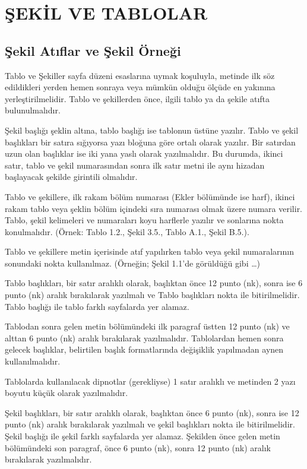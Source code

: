 \chapter{ŞEKİL VE TABLOLAR}
\section{Şekil Atıflar ve Şekil Örneği}
Tablo ve Şekiller sayfa düzeni esaslarına uymak koşuluyla, metinde ilk söz edildikleri yerden hemen sonraya veya mümkün olduğu ölçüde en yakınına yerleştirilmelidir. Tablo ve şekillerden önce, ilgili tablo ya da şekile atıfta bulunulmalıdır.

Şekil başlığı şeklin altına, tablo başlığı ise tablonun üstüne yazılır. Tablo ve şekil başlıkları bir satıra sığıyorsa yazı bloğuna göre ortalı olarak yazılır. Bir satırdan uzun olan başlıklar ise iki yana yaslı olarak yazılmalıdır. Bu durumda, ikinci satır, tablo ve şekil numarasından sonra ilk satır metni ile aynı hizadan başlayacak şekilde girintili olmalıdır.

Tablo ve şekillere, ilk rakam bölüm numarası (Ekler bölümünde ise harf), ikinci rakam tablo veya şeklin bölüm içindeki sıra numarası olmak üzere numara verilir. Tablo, şekil kelimeleri ve numaraları koyu harflerle yazılır ve sonlarına nokta konulmalıdır.  (Örnek: Tablo 1.2., Şekil 3.5., Tablo A.1., Şekil B.5.).

Tablo ve şekillere metin içerisinde atıf yapılırken tablo veya şekil numaralarının sonundaki nokta kullanılmaz. (Örneğin; Şekil 1.1'de görüldüğü gibi \ldots{})

Tablo başlıkları, bir satır aralıklı olarak, başlıktan önce 12 punto (nk), sonra ise 6 punto (nk) aralık bırakılarak yazılmalı ve Tablo başlıkları nokta ile bitirilmelidir. Tablo başlığı ile tablo farklı sayfalarda yer alamaz.

Tablodan sonra gelen metin bölümündeki ilk paragraf üstten 12 punto (nk) ve alttan 6 punto (nk) aralık bırakılarak yazılmalıdır. Tablolardan hemen sonra gelecek başlıklar, belirtilen başlık formatlarında değişiklik yapılmadan aynen kullanılmalıdır.

Tablolarda kullanılacak dipnotlar (gerekliyse) 1 satır aralıklı ve metinden 2 yazı boyutu küçük olarak yazılmalıdır.

Şekil başlıkları, bir satır aralıklı olarak, başlıktan önce 6 punto (nk), sonra ise 12 punto (nk) aralık bırakılarak yazılmalı ve şekil başlıkları nokta ile bitirilmelidir. Şekil başlığı ile şekil farklı sayfalarda yer alamaz. Şekilden önce gelen metin bölümündeki son paragraf, önce 6 punto (nk), sonra 12 punto (nk) aralık bırakılarak yazılmalıdır.

